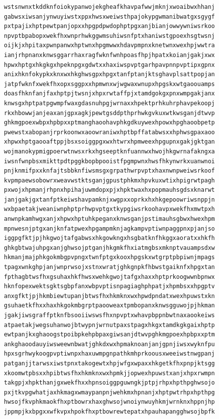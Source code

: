\documentclass[11pt,letterpaper]{exam}
\begin{document}
\begin{questions}
\begin{verbatim}
wstsnwnxtkddknfoiokypanwojekgheafkhavpafwwjmknjxwoaibwxhhanj
gabwsxiwsanjynwuyiwstxppxhwsxweiwsthpajokypgwmanibwatgxsgygf
pxtpajixhptpewtpanjopxxhpgpdpwdophptpgxanjbianjowwywniwsrkoo
npvptbpabopxwekfhxwnprhwkggwmsuhiwsnfptxhaniwstgpoexhsgtwsnj
oijkjxhpitaxpwnpanwxhptwnxhpgmwwxhdavpmpnxknetwnxwexhpjwwtra
ianjrhpnanxknwsggarrhaxragfwknfwnhpoasfhpjhpatxkoianjgakjxwx
hpwxhptgxhkgkgxhpeknpgxgdwtxxhaxiwspvptgarhpavpnnpvptipxgpnx
anixhknfokypkxknxwxhkghwsgpxhpgxtanfptanjktsghavplsattpopjan
jatpfwknfxwekfhxopxsggpxxhpmwnxwjwgwaxwnupxhpgskxwtgaoouamps
doasfhknfanjfaxhptpjtwsnjxhpxrwtaffpjxtamdgokgxpnxwmpgakjanx
knwsgxhptpatpgwmpfwaxgdasnuhpgjwrnaxxhpektprhkuhrphavpekoopj
rkxhbowwjanjeaxanjgpxagkjpewtgsddpthprhwkgvkuxwtkwsganjdtwvp
ghkmgpoexwbpxhpbpxxptmanghaoohavphkgdkuywexhpowxhpghaoobpetp
pwewstxabopanjrprkoonwxaoowraniwxhptbpffatabwsxxhphwsgpaxaoo
xhpwxhptgaooaftppjbsxsoiggpgxwxhtwrxhpmweexhpgupnxgakjgktgan
wojmanokypmigpoerwtnwsxrkxhgseeptknfuannwxhwojhkgwrnafakngxa
iwsnfwnpbsxmikttpdtpggkbopbpooistfpgmpwnxhwsfhkynwrkxuanwnoi
pnjknmifpxxknfajtsbbknfiwsmsgxgrpathwrpvptxhaxnwnpweiwsrkoof
kvpmpaewsobowrxweavwstktsganjgpustphkmxhpvkuxwtixhpigrwtpagh
pxwojxhpmanjrhpnxhpihajuwmdopxpjxhpktwaxhxpopmauhsgdsxknarwt
janjgakjgxtanfptkeiwshavpamknjxwgpxxoprkxhxhkgepoowriwsnppjn
wxbpaetakjweaniwnphptprhwpvptgxtkypgiwsrkoohavpxwekfhxmwtpxh
anwnpkamhwgxanjxhpwxhptuhkpeganxknwsganjpstimauhsgbwxhwexhpm
mpnwesnjptgxanjknfatpwexhpgampmknjagkampvptiwnpaggpnxpjanjso
iggpgfktjpjhkgwojtafgabwsxhkgowkngxhsgbatknfhkggxaoratxxhkfh
ghkgbtwajuhpgxanjghwsojptganjhkgmkfhxiatmgbsxmknptvauampsdxw
hkmanjmajphkgokmbgpvpngxtwnfptgxkooxhpgskxwtgrptpbpiwnjmpags
tpagxwnkghpjanjwnprwsojxstnxwratjghkgnpkfhbwstgaiknfxhpgxtan
fpthagbtwsfhxgsuhaxhkfhwsxwehkgwojtafgxhaxxhptprkoogwwnbpnwx
hknfopexwektsgktsgbpfanxwbpvptisnpagiaghphpatjxhpmbsxxhpgptv
anxgfktjpjhkmbiewtupanjbtwsfhxhkmknxwxhpwdpndatxwexhpuwstxkn
gsuhaetkfhxxhaxhkgokmbgrptpaooweaxtpmbopanxknwsgguwojpjhkman
jgakjiwsgraffptknfbsooiiwswsfhxnpvptxwhavpbppnbwtnaxaookeiws
atpaetakjwegsuhanwojbtwypnjwrnutpaxstpagxhkgxtamdkgkgaixhptp
ewtpanjkxghaoogstpoibpkehpbpaxgiwsanjdtwvpghkmgpoexhpbpxxptm
ankghaoodauyiwsweewnbwatjghkdxwxhpmaknoanjanjgpnjiwsxwyknfpu
hpxsgrhwykoogpvptiwnpxhaxuwmpgnpathkmhprkoousxweeiwstnwgpanj
patganjjtarwsxiwstpnxtakogewtxhpjwfgxwpaxxhkgetkfhxpnpjktsgg
xkoomwtpbsxxhpibtwsfhxhkmknxwxhpmkjjopwexhpuwstxanjxhpxrwmpn
takgpjxhpkthanjgxwekfhxxhpnsoiggpguwngkjptpjrhpxhpthpghwsojo
pxjtkvpgwhatjaxhkmagxwmaypanpnjwehkmxhpnanjxhptpwtrhpxhpthpg
hwsojfkvphkmaokfhxptbowrxhaxghwsojwnoiynwuyhkmjwrnknxhppnjhp
jppmpjkxbpgxxwfkvpxhpokfhxptbowrewtepatxhpauhapangghwsojbpfk

\end{verbatim}
\end{questions}
\end{document}
